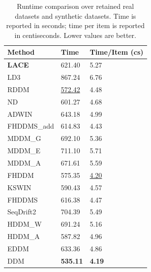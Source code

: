 \begin{table}
\caption{Runtime comparison over retained real datasets and synthetic datasets. Time is reported in seconds; time per item is reported in centiseconds. Lower values are better.}
\label{tab:baseline_runtime}
\begin{tabular}{lll}
\toprule
Method & Time & Time/Item (cs) \\
\midrule
\textbf{LACE} & 621.40 & 5.27 \\
LD3 & 867.24 & 6.76 \\
RDDM & \underline{572.42} & 4.48 \\
ND & 601.27 & 4.68 \\
ADWIN & 643.18 & 4.99 \\
FHDDMS\_add & 614.83 & 4.43 \\
MDDM\_G & 692.10 & 5.36 \\
MDDM\_E & 711.10 & 5.71 \\
MDDM\_A & 671.61 & 5.59 \\
FHDDM & 575.35 & \underline{4.20} \\
KSWIN & 590.43 & 4.57 \\
FHDDMS & 616.38 & 4.47 \\
SeqDrift2 & 704.39 & 5.49 \\
HDDM\_W & 691.24 & 5.16 \\
HDDM\_A & 587.82 & 4.96 \\
EDDM & 633.36 & 4.86 \\
DDM & \textbf{535.11} & \textbf{4.19} \\
\bottomrule
\end{tabular}
\end{table}
